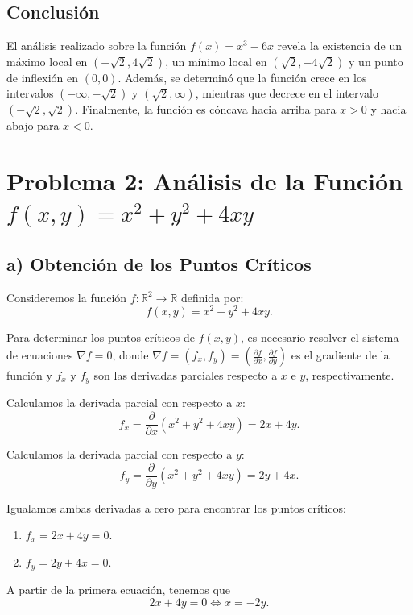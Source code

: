 \documentclass{article}
\begin{document}
\subsection*{Conclusión}
El análisis realizado sobre la función \( f(x) = x^3 - 6x \) revela la existencia de un máximo local en \( (-\sqrt{2}, 4\sqrt{2}) \), un mínimo local en \( (\sqrt{2}, -4\sqrt{2}) \) y un punto de inflexión en \( (0, 0) \). Además, se determinó que la función crece en los intervalos \( (-\infty, -\sqrt{2}) \) y \( (\sqrt{2}, \infty) \), mientras que decrece en el intervalo \( (-\sqrt{2}, \sqrt{2}) \). Finalmente, la función es cóncava hacia arriba para \( x > 0 \) y hacia abajo para \( x < 0 \).

\newpage

\section*{Problema 2: Análisis de la Función \(f(x, y) = x^2 + y^2 + 4xy\)}

\subsection*{a) Obtención de los Puntos Críticos}

Consideremos la función \( f : \mathbb{R}^2 \to \mathbb{R} \) definida por:
\[
f(x, y) = x^2 + y^2 + 4xy.
\]

Para determinar los puntos críticos de \( f(x, y) \), es necesario resolver el sistema de ecuaciones \( \nabla f = 0 \), donde \( \nabla f = (f_x, f_y) = \left( \frac{\partial f}{\partial x}, \frac{\partial f}{\partial y} \right) \) es el gradiente de la función y \( f_x \) y \( f_y \) son las derivadas parciales respecto a \( x \) e \( y \), respectivamente.

Calculamos la derivada parcial con respecto a \( x \):
\[
f_x = \frac{\partial}{\partial x}(x^2 + y^2 + 4xy) = 2x + 4y.
\]

Calculamos la derivada parcial con respecto a \( y \):
\[
f_y = \frac{\partial}{\partial y }(x^2 + y^2 + 4xy) = 2y + 4x.
\]

Igualamos ambas derivadas a cero para encontrar los puntos críticos:
\begin{enumerate}
	\item \( f_x = 2x + 4y = 0 \).
	\item \( f_y = 2y + 4x = 0 \).
\end{enumerate}

A partir de la primera ecuación, tenemos que
\[
2x + 4y = 0 \iff x = -2y.
\]
\end{document}
